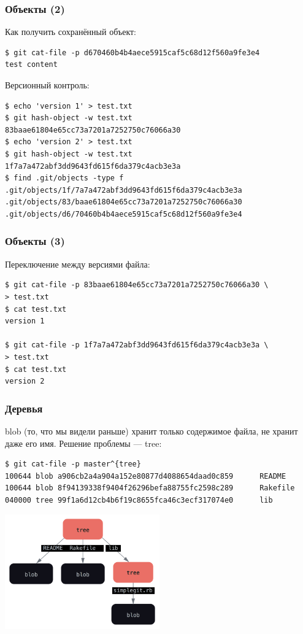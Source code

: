 \documentclass{../cscslides}
\begin{document}
    \begin{frame}[fragile]
        \frametitle{Объекты (2)}
        Как получить сохранённый объект:
        \begin{verbatim}
$ git cat-file -p d670460b4b4aece5915caf5c68d12f560a9fe3e4
test content
        \end{verbatim}

        Версионный контроль:
        \begin{verbatim}
$ echo 'version 1' > test.txt
$ git hash-object -w test.txt
83baae61804e65cc73a7201a7252750c76066a30
$ echo 'version 2' > test.txt
$ git hash-object -w test.txt
1f7a7a472abf3dd9643fd615f6da379c4acb3e3a
$ find .git/objects -type f
.git/objects/1f/7a7a472abf3dd9643fd615f6da379c4acb3e3a
.git/objects/83/baae61804e65cc73a7201a7252750c76066a30
.git/objects/d6/70460b4b4aece5915caf5c68d12f560a9fe3e4
        \end{verbatim}
    \end{frame}

    \begin{frame}[fragile]
        \frametitle{Объекты (3)}
        Переключение между версиями файла:
        \begin{verbatim}
$ git cat-file -p 83baae61804e65cc73a7201a7252750c76066a30 \
> test.txt
$ cat test.txt
version 1

$ git cat-file -p 1f7a7a472abf3dd9643fd615f6da379c4acb3e3a \
> test.txt
$ cat test.txt
version 2
        \end{verbatim}
    \end{frame}

    \begin{frame}[fragile]
        \frametitle{Деревья}
        blob (то, что мы видели раньше) хранит только содержимое файла, не хранит даже его имя. Решение проблемы --- tree:
        \begin{scriptsize}
        \begin{verbatim}
$ git cat-file -p master^{tree}
100644 blob a906cb2a4a904a152e80877d4088654daad0c859      README
100644 blob 8f94139338f9404f26296befa88755fc2598c289      Rakefile
040000 tree 99f1a6d12cb4b6f19c8655fca46c3ecf317074e0      lib
        \end{verbatim}
        \end{scriptsize}
        \begin{center}
            \includegraphics[width=0.5\textwidth]{gitTreeObjectBlack.png}
        \end{center}
    \end{frame}
\end{document}
